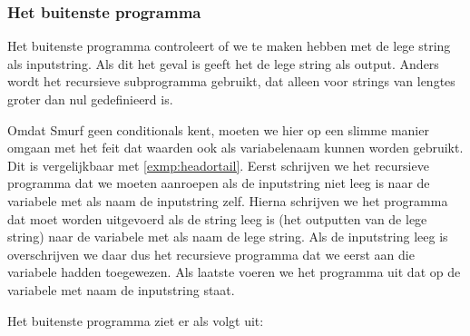 \subsubsection{Het buitenste programma}
Het buitenste programma controleert of we te maken hebben met de lege string
als inputstring. Als dit het geval is geeft het de lege string als output.
Anders wordt het recursieve subprogramma gebruikt, dat alleen voor strings van
lengtes groter dan nul gedefinieerd is.

Omdat Smurf geen conditionals kent, moeten we hier op een slimme manier omgaan
met het feit dat waarden ook als variabelenaam kunnen worden gebruikt. Dit is
vergelijkbaar met \autoref{exmp:headortail}. Eerst schrijven we het recursieve
programma dat we moeten aanroepen als de inputstring niet leeg is naar de
variabele met als naam de inputstring zelf. Hierna schrijven we het programma
dat moet worden uitgevoerd als de string leeg is (het outputten van de lege
string) naar de variabele met als naam de lege string. Als de inputstring leeg
is overschrijven we daar dus het recursieve programma dat we eerst aan die
variabele hadden toegewezen. Als laatste voeren we het programma uit dat op de
variabele met naam de inputstring staat.

Het buitenste programma ziet er als volgt uit:
\begin{center}
\end{center}

